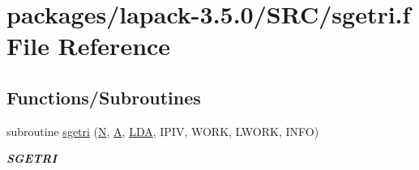 \hypertarget{sgetri_8f}{}\section{packages/lapack-\/3.5.0/\+S\+R\+C/sgetri.f File Reference}
\label{sgetri_8f}
\subsection*{Functions/\+Subroutines}
\begin{DoxyCompactItemize}
\item 
subroutine \hyperlink{group__realGEcomputational_ga1af62182327d0be67b1717db399d7d83}{sgetri} (\hyperlink{polmisc_8c_a0240ac851181b84ac374872dc5434ee4}{N}, \hyperlink{classA}{A}, \hyperlink{example__user_8c_ae946da542ce0db94dced19b2ecefd1aa}{L\+D\+A}, I\+P\+I\+V, W\+O\+R\+K, L\+W\+O\+R\+K, I\+N\+F\+O)
\begin{DoxyCompactList}\small\item\em {\bfseries S\+G\+E\+T\+R\+I} \end{DoxyCompactList}\end{DoxyCompactItemize}
